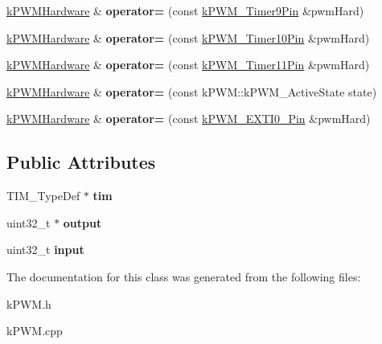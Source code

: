 \begin{DoxyCompactItemize}
\item 
\hyperlink{classkPWM_1_1kPWMHardware}{k\+P\+W\+M\+Hardware} \& {\bfseries operator=} (const \hyperlink{structkPWM__Timer9Pin}{k\+P\+W\+M\+\_\+\+Timer9\+Pin} \&pwm\+Hard)\hypertarget{classkPWM_1_1kPWMHardware_a919592a44da54464e729537839bbd95b}{}\label{classkPWM_1_1kPWMHardware_a919592a44da54464e729537839bbd95b}

\item 
\hyperlink{classkPWM_1_1kPWMHardware}{k\+P\+W\+M\+Hardware} \& {\bfseries operator=} (const \hyperlink{structkPWM__Timer10Pin}{k\+P\+W\+M\+\_\+\+Timer10\+Pin} \&pwm\+Hard)\hypertarget{classkPWM_1_1kPWMHardware_a9ccf3def0e1eb585dfed27d2e4f5a2f7}{}\label{classkPWM_1_1kPWMHardware_a9ccf3def0e1eb585dfed27d2e4f5a2f7}

\item 
\hyperlink{classkPWM_1_1kPWMHardware}{k\+P\+W\+M\+Hardware} \& {\bfseries operator=} (const \hyperlink{structkPWM__Timer11Pin}{k\+P\+W\+M\+\_\+\+Timer11\+Pin} \&pwm\+Hard)\hypertarget{classkPWM_1_1kPWMHardware_a3116709156c3905e8cc6f19a87fec76f}{}\label{classkPWM_1_1kPWMHardware_a3116709156c3905e8cc6f19a87fec76f}

\item 
\hyperlink{classkPWM_1_1kPWMHardware}{k\+P\+W\+M\+Hardware} \& {\bfseries operator=} (const k\+P\+W\+M\+::k\+P\+W\+M\+\_\+\+Active\+State state)\hypertarget{classkPWM_1_1kPWMHardware_a8b52bc1d5f06fcb6152629ac88741372}{}\label{classkPWM_1_1kPWMHardware_a8b52bc1d5f06fcb6152629ac88741372}

\item 
\hyperlink{classkPWM_1_1kPWMHardware}{k\+P\+W\+M\+Hardware} \& {\bfseries operator=} (const \hyperlink{structkPWM__EXTI0__Pin}{k\+P\+W\+M\+\_\+\+E\+X\+T\+I0\+\_\+\+Pin} \&pwm\+Hard)\hypertarget{classkPWM_1_1kPWMHardware_adc259bf9925d9c809b50d761751a7d38}{}\label{classkPWM_1_1kPWMHardware_adc259bf9925d9c809b50d761751a7d38}

\end{DoxyCompactItemize}
\subsection*{Public Attributes}
\begin{DoxyCompactItemize}
\item 
T\+I\+M\+\_\+\+Type\+Def $\ast$ {\bfseries tim}\hypertarget{classkPWM_1_1kPWMHardware_a5452e7cf3462cfd59e1fff29575b503c}{}\label{classkPWM_1_1kPWMHardware_a5452e7cf3462cfd59e1fff29575b503c}

\item 
uint32\+\_\+t $\ast$ {\bfseries output}\hypertarget{classkPWM_1_1kPWMHardware_ac688787abc9ee29b8d4c6b2e9f798159}{}\label{classkPWM_1_1kPWMHardware_ac688787abc9ee29b8d4c6b2e9f798159}

\item 
uint32\+\_\+t {\bfseries input}\hypertarget{classkPWM_1_1kPWMHardware_a3107a8671ec1e9f8fe6ed1e2aa262203}{}\label{classkPWM_1_1kPWMHardware_a3107a8671ec1e9f8fe6ed1e2aa262203}

\end{DoxyCompactItemize}


The documentation for this class was generated from the following files\+:\begin{DoxyCompactItemize}
\item 
k\+P\+W\+M.\+h\item 
k\+P\+W\+M.\+cpp\end{DoxyCompactItemize}
